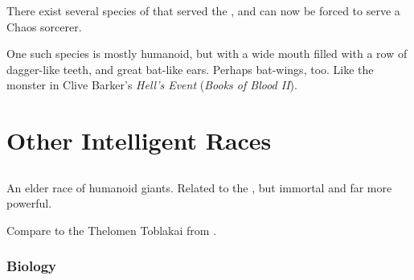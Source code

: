 \subsection{\XzaiShannic \pdaemons}
There exist several species of \pdaemons{} that served the \xzaishanns, and can now be forced to serve a Chaos sorcerer. 

One such species is mostly humanoid, but with a wide mouth filled with a row of dagger-like teeth, and great bat-like ears. 
Perhaps bat-wings, too. 
Like the monster in Clive Barker's \emph{Hell's Event} (\emph{Books of Blood II}). 























\chapter{Other Intelligent Races}















\section{\Aryoth}
\index{\aryoth}
An elder race of humanoid giants. 
Related to the \nephilim, but immortal and far more powerful. 


Compare to the Thelomen Toblakai from \cite{StevenEriksonIanCameronEsslemont:MalazanBookoftheFallen}. 









\subsection{Biology}





